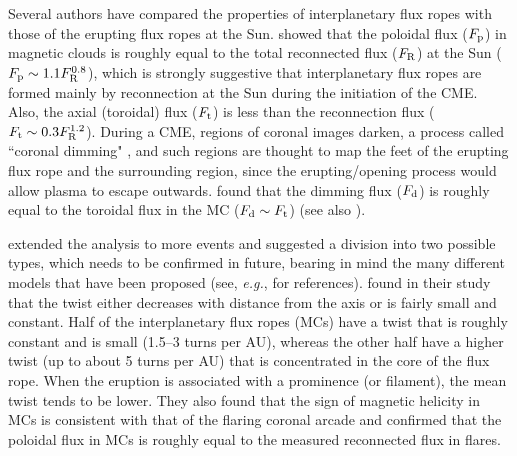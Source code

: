 \documentclass[10pt,namedreferneces]{SolarPhysics}
\begin{document}
\begin{article}
Several authors have compared the properties of interplanetary flux ropes with those of the erupting flux ropes at the Sun.  showed that the poloidal flux ($F_{\rm p}$) in magnetic clouds is roughly equal to the total reconnected flux ($F_{\rm R}$) at the Sun ($F_{\rm p}\sim 1.1 F_{\rm R}^{0.8}$), which is strongly suggestive that interplanetary flux ropes are formed mainly by reconnection at the Sun during the initiation of the CME.  Also, the axial (toroidal) flux ($F_{\rm t}$) is less than the reconnection flux ($F_{\rm t}\sim 0.3 F_{\rm R}^{1.2}$).
During a CME, regions of coronal images darken, a process called ``coronal dimming" \cite{harrison00}, and such regions are thought to map the feet of the erupting flux rope and the surrounding region, since the erupting/opening process would allow plasma to escape outwards.  found that the dimming flux ($F_{\rm d}$) is roughly equal to the toroidal flux in the MC ($F_{\rm d}\sim F_{\rm t}$) (see also ).

 extended the analysis to more events and
suggested a division into two possible types, which needs to be confirmed in future, bearing in mind the many different models that have been proposed (see, \textit{e.g.},   for references).
 found in their study that the twist either decreases with distance from the axis or is fairly small and constant.  Half of the interplanetary flux ropes (MCs) have a twist that is roughly constant  and is small (1.5--3 turns per AU), whereas the other half have a higher twist (up to about 5 turns per AU) that is concentrated in the core of the flux rope.  When the eruption is associated with a prominence (or filament), the mean twist tends to be lower. They also found that the sign of magnetic helicity in MCs is consistent with that of the flaring coronal arcade and confirmed that the poloidal flux in MCs is roughly equal to the measured reconnected flux in flares. 


\end{article}
\end{document}
